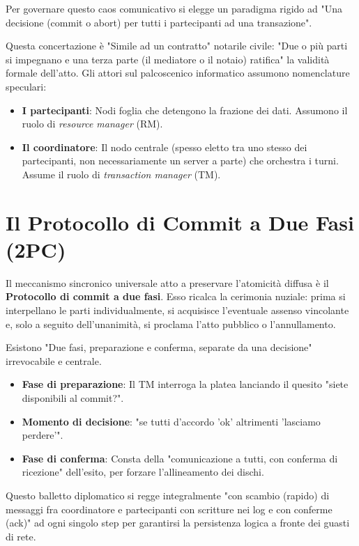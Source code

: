Per governare questo caos comunicativo si elegge un paradigma rigido ad "Una decisione (commit o abort) per tutti i partecipanti ad una transazione".

Questa concertazione è "Simile ad un contratto" notarile civile:
"Due o più parti si impegnano e una terza parte (il mediatore o il notaio) ratifica" la validità formale dell'atto.
Gli attori sul palcoscenico informatico assumono nomenclature speculari:
\begin{itemize}
    \item \textbf{I partecipanti}: Nodi foglia che detengono la frazione dei dati. Assumono il ruolo di \textit{resource manager} (RM).
    \item \textbf{Il coordinatore}: Il nodo centrale (spesso eletto tra uno stesso dei partecipanti, non necessariamente un server a parte) che orchestra i turni. Assume il ruolo di \textit{transaction manager} (TM).
\end{itemize}

\section{Il Protocollo di Commit a Due Fasi (2PC)}

Il meccanismo sincronico universale atto a preservare l'atomicità diffusa è il \textbf{Protocollo di commit a due fasi}. Esso ricalca la cerimonia nuziale: prima si interpellano le parti individualmente, si acquisisce l'eventuale assenso vincolante e, solo a seguito dell'unanimità, si proclama l'atto pubblico o l'annullamento.

Esistono "Due fasi, preparazione e conferma, separate da una decisione" irrevocabile e centrale.
\begin{itemize}
    \item \textbf{Fase di preparazione}: Il TM interroga la platea lanciando il quesito "siete disponibili al commit?".
    \item \textbf{Momento di decisione}: "se tutti d'accordo 'ok' altrimenti 'lasciamo perdere'".
    \item \textbf{Fase di conferma}: Consta della "comunicazione a tutti, con conferma di ricezione" dell'esito, per forzare l'allineamento dei dischi.
\end{itemize}
Questo balletto diplomatico si regge integralmente "con scambio (rapido) di messaggi fra coordinatore e partecipanti con scritture nei log e con conferme (ack)" ad ogni singolo step per garantirsi la persistenza logica a fronte dei guasti di rete.

